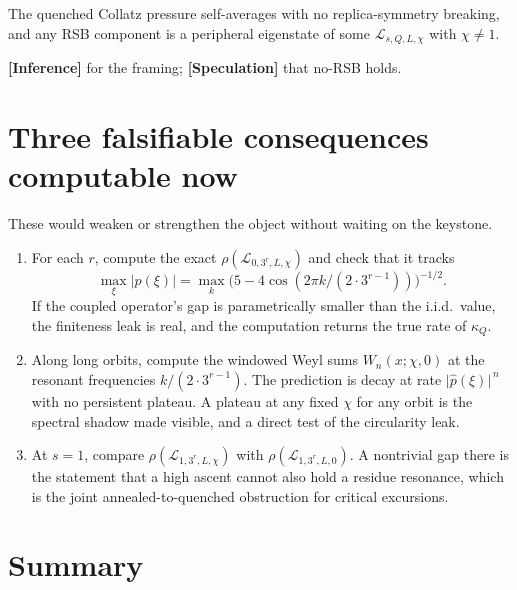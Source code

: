 \documentclass[11pt]{article}
\newcommand{\Lcal}{\mathcal{L}}
\newcommand{\epi}[1]{{\small\sffamily\textbf{[#1]}}}
\theoremstyle{remark}
\begin{document}
\begin{keystatement}
The quenched Collatz pressure self-averages with no replica-symmetry breaking, and any
RSB component is a peripheral eigenstate of some $\Lcal_{s,Q,L,\chi}$ with $\chi\ne 1$.
\end{keystatement}
\epi{Inference} for the framing; \epi{Speculation} that no-RSB holds.

\section{Three falsifiable consequences computable now}

These would weaken or strengthen the object without waiting on the keystone.

\begin{enumerate}[leftmargin=1.6em]
\item For each $r$, compute the exact $\rho(\Lcal_{0,3^r,L,\chi})$ and check that it tracks
\[
\max_\xi \lvert\hat p(\xi)\rvert
= \max_k \bigl(5 - 4\cos(2\pi k/(2\cdot 3^{r-1}))\bigr)^{-1/2}.
\]
If the coupled operator's gap is parametrically smaller than the i.i.d.\ value, the
finiteness leak is real, and the computation returns the true rate of $\kappa_Q$.

\item Along long orbits, compute the windowed Weyl sums $W_n(x;\chi,0)$ at the resonant
frequencies $k/(2\cdot 3^{r-1})$. The prediction is decay at rate
$\lvert\hat p(\xi)\rvert^{\,n}$ with no persistent plateau. A plateau at any fixed $\chi$
for any orbit is the spectral shadow made visible, and a direct test of the circularity
leak.

\item At $s=1$, compare $\rho(\Lcal_{1,3^r,L,\chi})$ with $\rho(\Lcal_{1,3^r,L,0})$. A
nontrivial gap there is the statement that a high ascent cannot also hold a residue
resonance, which is the joint annealed-to-quenched obstruction for critical excursions.
\end{enumerate}

\section*{Summary}
\end{document}
